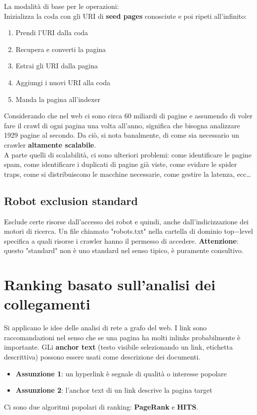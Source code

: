 La modalità di base per le operazioni:\\
Inizializza la coda con gli URI di \textbf{seed pages} conosciute e poi ripeti all'infinito:
\begin{enumerate}
    \item Prendi l'URI dalla coda
    \item Recupera e converti la pagina
    \item Estrai gli URI dalla pagina
    \item Aggiungi i nuovi URI alla coda
    \item Manda la pagina all'indexer
\end{enumerate}
Considerando che nel web ci sono circa 60 miliardi di pagine e assumendo di voler fare il crawl di ogni pagina una volta all'anno, significa che bisogna analizzare 1929 pagine al secondo. Da ciò, si nota banalmente, di come sia necessario un crawler \textbf{altamente scalabile}.\\

A parte quelli di scalabilità, ci sono ulteriori problemi: come identificare le pagine spam, come identificare i duplicati di pagine già viste, come evidare le spider traps, come si distribuiscono le macchine necessarie, come gestire la latenza, ecc\dots

\subsection{Robot exclusion standard}
Esclude certe risorse dall'accesso dei robot e quindi, anche dall'indicizzazione dei motori di ricerca. Un file chiamato "robots.txt" nella cartella di dominio top$-$level 
specifica a quali risorse i crawler hanno il permesso di accedere. \textbf{Attenzione}: questo "standard" non è uno standard nel senso tipico, è puramente consultivo. 

\section{Ranking basato sull'analisi dei collegamenti}
Si applicano le idee delle analisi di rete a grafo del web. I link sono raccomandazioni nel senso che se una pagina ha molti inlinks probabilmente è importante. GLi \textbf{anchor text} (testo visibile selezionando un link, etichetta descrittiva) possono essere usati come descrizione dei documenti. 
\begin{itemize}
    \item \textbf{Assunzione 1}: un hyperlink è segnale di qualità o interesse popolare
    \item \textbf{Assunzione 2}: l'anchor text di un link descrive la pagina target
\end{itemize}
Ci sono due algoritmi popolari di ranking: \textbf{PageRank} e \textbf{HITS}.

